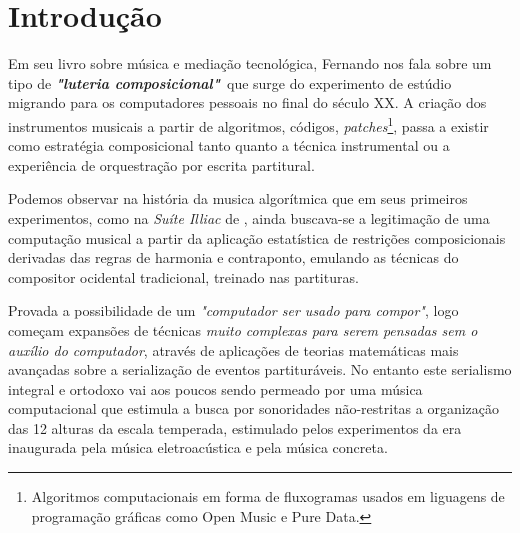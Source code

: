 \documentclass[
	12pt,				%
	openright,			%
	twoside,			%
	a4paper,			%
	english,			%
	french,				%
	spanish,			%
	brazil				%
	]{abntex2}
\begin{document}
\tableofcontents*
\cleardoublepage

%
%
%
%
%
%
%
\textual




\chapter*[Introdução]{Introdução}

Em seu livro sobre música e mediação tecnológica, Fernando  nos fala sobre um tipo de \textit{\textbf{"luteria composicional"}}\ que surge do experimento de estúdio migrando para os computadores pessoais no final do século XX. A criação dos instrumentos musicais a partir de algoritmos, códigos, \textit{patches}\footnote{Algoritmos computacionais em forma de fluxogramas usados em liguagens de programação gráficas como Open Music e Pure Data.}, passa a existir como estratégia composicional tanto quanto a técnica instrumental ou a experiência de orquestração por escrita partitural. 

Podemos observar na história da musica algorítmica que em seus primeiros experimentos, como na \textit{Suíte Illiac} de , ainda buscava-se a legitimação de uma computação musical a partir da aplicação estatística de restrições composicionais derivadas das regras de harmonia e contraponto, emulando as técnicas do compositor ocidental tradicional, treinado nas partituras. 

Provada a possibilidade de um \textit{"computador ser usado para compor"}, logo começam expansões de técnicas \textit{muito complexas para serem pensadas sem o auxílio do computador}, através de aplicações de teorias matemáticas mais avançadas sobre a serialização de eventos partituráveis. No entanto este serialismo integral e ortodoxo vai aos poucos sendo permeado por uma música computacional que estimula a busca por sonoridades não-restritas a organização das 12 alturas da escala temperada, estimulado pelos experimentos da era inaugurada pela música eletroacústica e pela música concreta.
\end{document}
